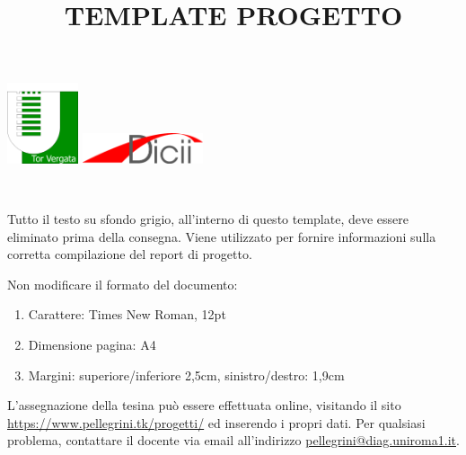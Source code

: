 \documentclass[12pt]{article}
\title{TEMPLATE PROGETTO}
\begin{document}
\includegraphics[width=2.1cm, valign=t]{image1}
\hfill
\includegraphics[width=3.55cm, valign=t]{image2}
{\let\newpage\relax\maketitle}
\tableofcontents
\
\begin{templateblock}
    Tutto il testo su sfondo grigio, all’interno di questo template,
    deve essere eliminato prima della consegna.
    Viene utilizzato per fornire informazioni sulla corretta compilazione
    del report di progetto.

    Non modificare il formato del documento:
    \begin{enumerate}
        \item Carattere: Times New Roman, 12pt
        \item Dimensione pagina: A4
        \item Margini: superiore/inferiore 2,5cm, sinistro/destro: 1,9cm
    \end{enumerate}

    L’assegnazione della tesina può essere effettuata online, visitando il
    sito \href{https://www.pellegrini.tk/progetti/}
    {https://www.pellegrini.tk/progetti/} ed inserendo i propri dati.
    Per qualsiasi problema, contattare il docente via email all’indirizzo
    \url{pellegrini@diag.uniroma1.it}.
\end{templateblock}





\appendix

\end{document}
